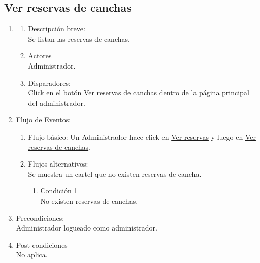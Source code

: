 \documentclass[a4paper,11pt]{article}
\begin{document}
\subsection{Ver reservas de canchas}
\begin{enumerate}

    \item
    \begin{enumerate}
    \item Descripción breve: \\
        Se listan las reservas de canchas.
    \item Actores \\
        Administrador.
    \item Disparadores: \\
        Click en el botón \underline{Ver reservas de canchas}
        dentro de la página principal del administrador.
    \end{enumerate}

    \item Flujo de Eventos:

    \begin{enumerate}

        \item Flujo básico:
            Un Administrador hace click en \underline{Ver reservas} y luego
            en \underline{Ver reservas de canchas}.
        \item Flujos alternativos:\\
            Se muestra un cartel que no existen reservas de cancha.
            \begin{enumerate}
                \item Condición 1 \\
                    No existen reservas de canchas.
            \end{enumerate}

    \end{enumerate}

    \item Precondiciones: \\
        Administrador logueado como administrador.

    \item Post condiciones \\
        No aplica.

\end{enumerate}
\end{document}
